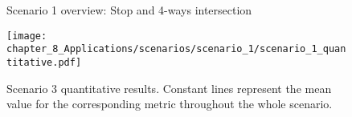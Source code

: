 
	\begin{figure}[]
		\centering
		\caption{Scenario 1 overview: Stop and 4-ways intersection}
		\label{fig:chapter_8_Applications/scenarios/scenario_1/scenario_1_route22_town03_training}
	\end{figure}
	
	\begin{figure}[]
		\centering
		\texttt{[image: chapter\_8\_Applications/scenarios/scenario\_1/scenario\_1\_quantitative.pdf]}
		\captionsetup{justification=justified}
		\caption[Scenario 1 quantitative results]{Scenario 3 quantitative results. Constant lines represent the mean value for the corresponding metric throughout the whole scenario.}
		\label{fig:chapter_8_Applications/scenarios/scenario_1/scenario_1_quantitative}
	\end{figure}

